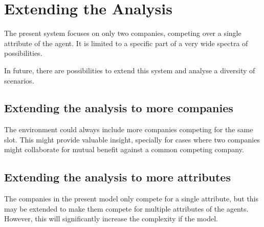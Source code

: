 
\chapter{Extending the Analysis} %

\label{Chapter6} %


The present system focuses on only two companies, competing over a single attribute of the agent. It is limited to a specific  part of a very wide spectra of possibilities.

In future, there are possibilities to extend this system and analyse a diversity of scenarios.


\section{Extending the analysis to more companies}

The environment could always include more companies competing for the same slot. This might provide valuable insight, specially for cases where two companies might collaborate for mutual benefit against a common competing company.


\section{Extending the analysis to more attributes}

The companies in the present model only compete for a single attribute, but this may be extended to make them compete for multiple attributes of the  agents. However, this will significantly increase the complexity if the model.


